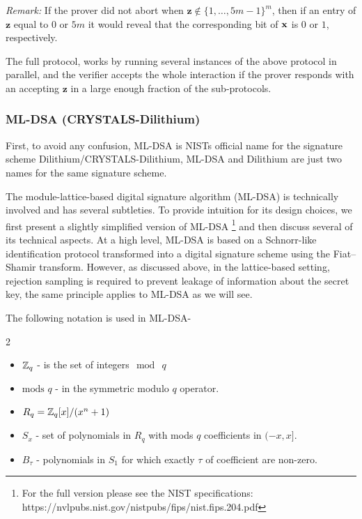 \textit{Remark:} If the prover did not abort when \(\mathbf{z}\notin\{1,\dots,5m-1\}^m\), then if an entry of \(\mathbf{z}\) equal to \(0\) or \(5m\) it would reveal that the corresponding bit of \(\mathbf{x}\) is \(0\) or \(1\), respectively.

The full protocol, works by running several instances of the above protocol in parallel, and the verifier accepts the whole interaction if the prover responds with an accepting \(\mathbf{z}\) in a large enough fraction of the sub-protocols.

\subsubsection{ML-DSA (CRYSTALS-Dilithium)}
First, to avoid any confusion, ML-DSA is NISTs official name for the signature scheme Dilithium/CRYSTALS-Dilithium, \ie ML-DSA and Dilithium are just two names for the same signature scheme.

The module-lattice-based digital signature algorithm (ML-DSA) is technically involved and has several subtleties. To provide intuition for its design choices, we first present a slightly simplified version of ML-DSA \footnote{For the full version please see the NIST specifications: https://nvlpubs.nist.gov/nistpubs/fips/nist.fips.204.pdf} and then discuss several of its technical aspects. At a high level, ML-DSA is based on a Schnorr-like identification protocol transformed into a digital signature scheme using the Fiat–Shamir transform. However, as discussed above, in the lattice-based setting, rejection sampling is required to prevent leakage of information about the secret key, the same principle applies to ML-DSA as we will see.

The following notation is used in ML-DSA-
\begin{multicols}{2}
\begin{itemize}
    \item \(\mathbb{Z}_q\) - is the set of integers\(\mod \: q\)
    \item \(\text{mods } q\) - in the symmetric modulo \(q\) operator.
    \item \(R_q =\mathbb{Z}_q[x]/(x^n+1)\)
    \item \(S_x\) - set of polynomials in \(R_q\) with mods \(q\) coefficients in \((-x,x]\). 
    \item \(B_\tau\) - polynomials in \(S_1\) for which exactly \(\tau\) of coefficient are non-zero.
\end{itemize}
\end{multicols}

